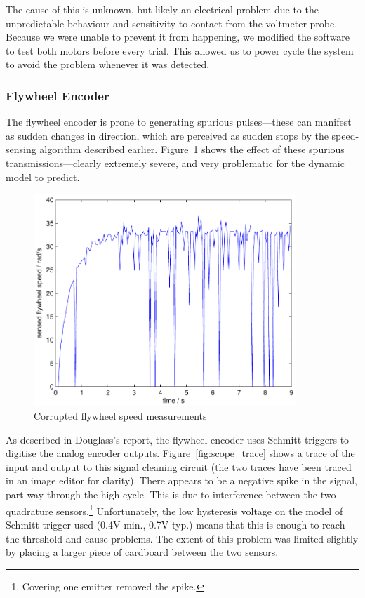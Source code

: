\documentclass{IIBproject}
\begin{document}
The cause of this is unknown, but likely an electrical problem due to the
unpredictable behaviour and sensitivity to contact from the voltmeter probe.
Because we were unable to prevent it from happening, we modified the software
to test both motors before every trial. This allowed us to power cycle the
system to avoid the problem whenever it was detected.

\subsubsection{Flywheel Encoder}
\label{sec:flywheel_encoder}

The flywheel encoder is prone to generating spurious pulses---these can
manifest as sudden changes in direction, which are perceived as sudden stops
by the speed-sensing algorithm described earlier.
Figure~\ref{fig:bad_fly_speed} shows the effect of these spurious
transmissions---clearly extremely severe, and very problematic for the dynamic
model to predict.

\begin{figure}[htpb]
  \begin{center}
    \includegraphics[height=8cm]{bad_fly_speed.pdf}
    \end{center}
    \caption{Corrupted flywheel speed measurements}
    \label{fig:bad_fly_speed}
    \end{figure}

As described in Douglass's report, the flywheel encoder uses Schmitt triggers
to digitise the analog encoder outputs. Figure~\ref{fig:scope_trace} shows a
trace of the input and output to this signal cleaning circuit (the two traces
have been traced in an image editor for clarity). There appears to be a
negative spike in the signal, part-way through the high cycle.  This is due to
interference between the two quadrature sensors.\footnote{Covering one emitter removed
the spike.} Unfortunately, the low hysteresis voltage on the model of Schmitt
trigger used (0.4V min., 0.7V typ.) means that this is enough to reach the
threshold and cause problems. The extent of this problem was limited slightly
by placing a larger piece of cardboard between the two sensors.
\end{document}
